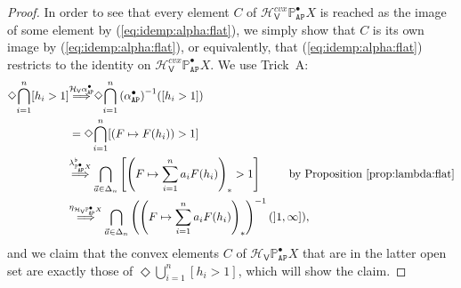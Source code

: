 \documentclass[preprint,12pt]{elsarticle}
\newcommand\Pred{\mathbb{P}}
\newcommand\Angel{{\mathtt{A}}}
\newcommand\Nature{{\mathtt{P}}}
\newcommand\AN{{\Angel\Nature}}
\newcommand\invto[1]{{\buildrel {#1} \over\Longrightarrow}}
\newcommand\Hoare{{\mathcal H}}
\newcommand\Vt{\mathsf{V}}
\newcommand\HV{\Hoare_\Vt}
\begin{document}
\begin{proof}
  In order to see that every element $C$ of
  $\HV^{cvx} {\Pred_\AN^\bullet X}$ is reached as the image of some
  element by (\ref{eq:idemp:alpha:flat}), we simply show that $C$ is its
  own image by (\ref{eq:idemp:alpha:flat}), or equivalently, that
  (\ref{eq:idemp:alpha:flat}) restricts to the identity on
  $\HV^{cvx} {\Pred_\AN^\bullet X}$.  We use Trick~A:
  \begin{align*}
    \Diamond {\bigcap_{i=1}^n [h_i > 1]}
    & \invto{\HV {\alpha_\AN^\bullet}}
      \Diamond {\bigcap_{i=1}^n {(\alpha_\AN^\bullet)}^{-1} ([h_i > 1])}
    \\
    & = \Diamond {\bigcap_{i=1}^n [(F \mapsto F (h_i)) > 1]} \\
    & \invto{\lambda^\flat_{\Pred_\AN^\bullet X}}
      \bigcap_{\vec a \in \Delta_n} \left[\left(F \mapsto \sum_{i=1}^n
      a_i F (h_i)\right)_* > 1\right]
    & \text{by Proposition~\ref{prop:lambda:flat}} \\
    & \invto{\eta_{\HV {\Pred_\AN^\bullet X}}}
      \bigcap_{\vec a \in \Delta_n}  \left(\left(F \mapsto \sum_{i=1}^n
      a_i F (h_i)\right)_*\right)^{-1} (]1, \infty]),
      \mskip-50mu
  \end{align*}
  and we claim that the convex elements $C$ of $\HV {\Pred_\AN^\bullet
    X}$ that are in the latter open set are exactly those of $\Diamond
  {\bigcup_{i=1}^n [h_i > 1]}$, which will show the claim.


\end{proof}
\end{document}
